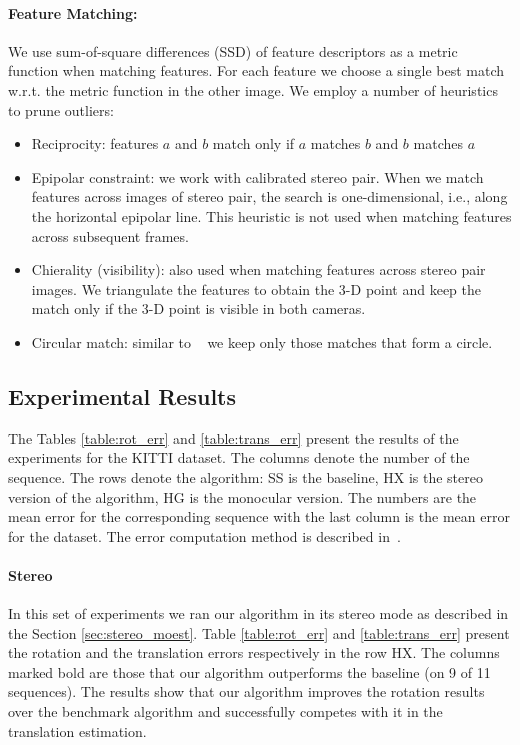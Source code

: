\documentclass{bmvc2k}
\begin{document}
\paragraph{Feature Matching:} We use sum-of-square differences (SSD)
of feature descriptors as a metric function when matching
features. For each feature we choose a single best match w.r.t. the
metric function in the other image. We employ a number of heuristics
to prune outliers:
\begin{itemize}
\item Reciprocity: features $a$ and $b$ match only if $a$ matches $b$
  and $b$ matches $a$
\item Epipolar constraint: we work with calibrated stereo pair.  When
  we match features across images of stereo pair, the search is
  one-dimensional, i.e., along the horizontal epipolar line.  This
  heuristic is not used when matching features across subsequent
  frames.
\item Chierality (visibility): also used when matching features across
  stereo pair images.  We triangulate the features to obtain the 3-D
  point and keep the match only if the 3-D point is visible in both
  cameras.
\item Circular match: similar to ~\cite{Geiger2011} we keep only those
  matches that form a circle.
\end{itemize}

\subsection{Experimental Results}

The Tables \ref{table:rot_err} and \ref{table:trans_err} present the
results of the experiments for the KITTI dataset. The columns denote
the number of the sequence.  The rows denote the algorithm: SS is the
baseline, HX is the stereo version of the algorithm, HG is the
monocular version.  The numbers are the mean error for the
corresponding sequence with the last column is the mean error for the
dataset. The error computation method is described
in~\cite{Geiger2012}.

\paragraph{Stereo} In this set of experiments we ran our algorithm in
its stereo mode as described in the Section \ref{sec:stereo_moest}.
Table \ref{table:rot_err} and \ref{table:trans_err} present the
rotation and the translation errors respectively in the row HX. The
columns marked bold are those that our algorithm outperforms the
baseline (on 9 of 11 sequences). The results show that our algorithm improves the
rotation results over the benchmark algorithm and successfully
competes with it in the translation estimation.
\end{document}
